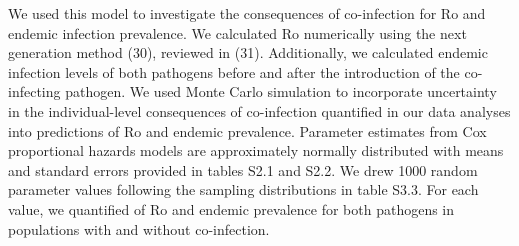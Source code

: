 \documentclass{article}
\begin{document}
We used this model to investigate the consequences of co-infection for Ro and endemic infection prevalence. We calculated Ro numerically using the next generation method (30), reviewed in (31). Additionally, we calculated endemic infection levels of both pathogens before and after the introduction of the co-infecting pathogen. We used Monte Carlo simulation to incorporate uncertainty in the individual-level consequences of co-infection quantified in our data analyses into predictions of Ro and endemic prevalence. Parameter estimates from Cox proportional hazards models are approximately normally distributed with means and standard errors provided in tables S2.1 and S2.2. We drew 1000 random parameter values following the sampling distributions in table S3.3.  For each value, we quantified of Ro and endemic prevalence for both pathogens in populations with and without co-infection.


\pagebreak
\end{document}
